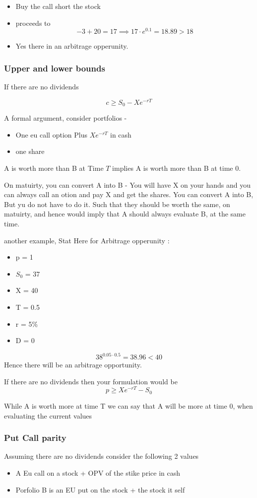 \documentclass{article}
\theoremstyle{mytheoremstyle}
\theoremstyle{mytheoremstyle}
\theoremstyle{myproblemstyle}
\begin{document}
\begin{itemize}
	\item Buy the call short the stock
	\item proceeds to $$ -3 + 20  = 17 \implies 17 \cdot e^{0.1} = 18.89 > 18$$
	\item Yes there in an arbitrage opperunity.
\end{itemize}

\subsubsection{Upper and lower bounds}
If there are no dividends

$$
	c \ge S_0 - Xe^{-rT}
$$

A formal argument, consider portfolios -
\begin{itemize}
	\item One eu call option Plus $Xe^{-rT}$ in cash
	\item one share
\end{itemize}
A is worth more than B at Time $T$ implies A is worth more than B at time 0.

On matuirty, you can convert A into B - You will have X on your hands and you can always call an otion and pay X and get the shares. You can convert A into B, But yu do not have to do it.
Such that they should be worth the same, on matuirty, and hence would imply that A should always evaluate B, at the same time.


another example, Stat Here for Arbitrage opperunity :
\begin{itemize}
	\item p = 1
	\item $ S_0 $ = 37
	\item X  = 40
	\item T = 0.5
	\item r = 5\%
	\item D = 0
\end{itemize}
$$  38^{0.05 \cdot 0.5} = 38.96 < 40 $$
Hence there will be an arbitrage opportunity.

If there are no dividends then your formulation would be
$$ p \ge Xe^{-rT} - S_0 $$

While A is worth more at time T we can say that A will be more at time 0, when evaluating the current values

\subsubsection{Put Call parity}
Assuming there are no dividends consider the following 2 values
\begin{itemize}
	\item A Eu call on a stock + OPV of the stike price in cash
	\item Porfolio B is an EU put on the stock + the stock it self
\end{itemize}
\end{document}
